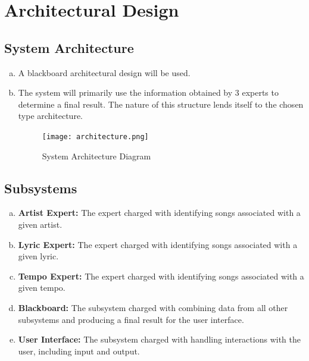 \documentclass[]{article}
\begin{document}
\section{Architectural Design}
\label{sec:architectural_design}

\subsection{System Architecture}
\label{sub:system_architecture}
\begin{enumerate}[a)]
	\item A blackboard architectural design will be used.
	\item The system will primarily use the information obtained by 3 experts to determine a final result. The nature of this structure lends itself to the chosen type architecture.
\begin{figure}[H]
	\centering
	\texttt{[image: architecture.png]}
	\caption{System Architecture Diagram}
\end{figure}
\end{enumerate}

\subsection{Subsystems}
\label{sub:subsystems}
\begin{enumerate}[a)]
	\item \textbf{Artist Expert:} The expert charged with identifying songs associated with a given artist.
	\item \textbf{Lyric Expert:} The expert charged with identifying songs associated with a given lyric.
	\item \textbf{Tempo Expert:} The expert charged with identifying songs associated with a given tempo.
	\item \textbf{Blackboard:} The subsystem charged with combining data from all other subsystems and producing a final result for the user interface.
	\item \textbf{User Interface:} The subsystem charged with handling interactions with the user, including input and output.
\end{enumerate}

	
\end{document}
